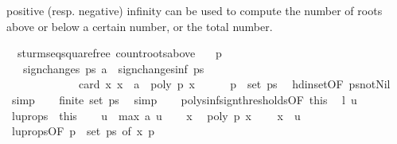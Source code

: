 \begin{isabellebody}
\begin{isamarkuptext}
  positive (resp. negative) infinity can be used to compute the 
  number of roots above or below a certain number, or the total number.%
\end{isamarkuptext}%
\isamarkuptrue%
\isamarkupfalse%
\ {\isacharparenleft}\ sturm{\isacharunderscore}seq{\isacharunderscore}squarefree{\isacharparenright}\ count{\isacharunderscore}roots{\isacharunderscore}above{\isacharcolon}\isanewline
\ \ \ {\isachardoublequoteopen}p\ {\isasymnoteq}\ {}{\isachardoublequoteclose}\isanewline
\ \ \ {\isachardoublequoteopen}sign{\isacharunderscore}changes\ ps\ a\ {\isacharminus}\ sign{\isacharunderscore}changes{\isacharunderscore}inf\ ps\ {\isacharequal}\ \isanewline
\ \ \ \ \ \ \ \ \ \ \ \ \ card\ {\isacharbraceleft}x{\isachardot}\ x\ {\isachargreater}\ a\ {\isasymand}\ poly\ p\ x\ {\isacharequal}\ {}{\isacharbraceright}{\isachardoublequoteclose}\isanewline
%
\isadelimproof
%
\endisadelimproof
%
\isatagproof
{}\isamarkupfalse%
{\isacharminus}\isanewline
\ \ \isamarkupfalse%
\ {\isachardoublequoteopen}p\ {\isasymin}\ set\ ps{\isachardoublequoteclose}\ \isamarkupfalse%
\ hd{\isacharunderscore}in{\isacharunderscore}set{\isacharbrackleft}OF\ ps{\isacharunderscore}not{\isacharunderscore}Nil{\isacharbrackright}\ \isamarkupfalse%
\ simp\isanewline
\ \ \isamarkupfalse%
\ {\isachardoublequoteopen}finite\ {\isacharparenleft}set\ ps{\isacharparenright}{\isachardoublequoteclose}\ \isamarkupfalse%
\ simp\isanewline
\ \ \isamarkupfalse%
\ polys{\isacharunderscore}inf{\isacharunderscore}sign{\isacharunderscore}thresholds{\isacharbrackleft}OF\ this{\isacharbrackright}\ \isamarkupfalse%
\ l\ u\ \isacommand{{\isachardot}}\isamarkupfalse%
\isanewline
\ \ \isamarkupfalse%
\ lu{\isacharunderscore}props\ {\isacharequal}\ this\isanewline
\ \ \isamarkupfalse%
\ {\isacharquery}u\ {\isacharequal}\ {\isachardoublequoteopen}max\ a\ u{\isachardoublequoteclose}\isanewline
\ \ \isacommand{{\isacharbraceleft}}\isamarkupfalse%
\isamarkupfalse%
\ x\ \isamarkupfalse%
\ {\isachardoublequoteopen}poly\ p\ x\ {\isacharequal}\ {}{\isachardoublequoteclose}\ \isamarkupfalse%
\ {\isachardoublequoteopen}x\ {\isasymle}\ {\isacharquery}u{\isachardoublequoteclose}\isanewline
\ \ \ \isamarkupfalse%
\ lu{\isacharunderscore}props{\isacharparenleft}{}{\isacharparenright}{\isacharbrackleft}OF\ {\isacharbackquoteopen}p\ {\isasymin}\ set\ ps{\isacharbackquoteclose}{\isacharcomma}\ of\ x{\isacharbrackright}\ {\isacharbackquoteopen}p\ {\isasymnoteq}\ {}{\isacharbackquoteclose}\isanewline

\end{isabellebody}
